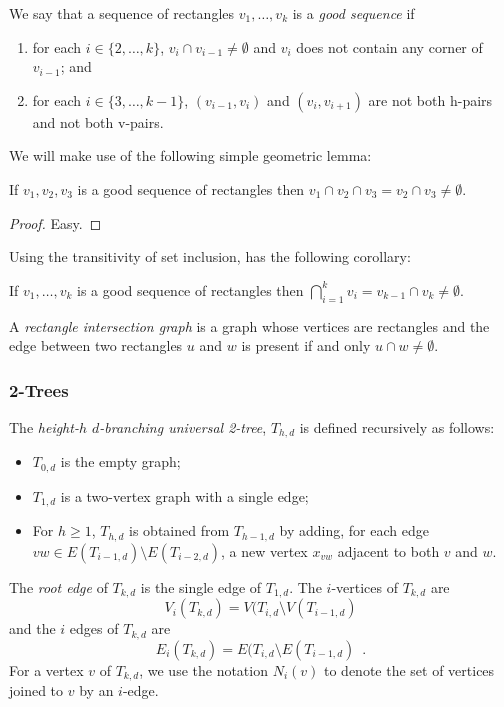 \documentclass[lotsofwhite]{patmorin}
\begin{document}
We say that a sequence of rectangles $v_1,\ldots,v_k$ is a \emph{good
sequence} if
\begin{enumerate}
  \item for each $i\in\{2,\ldots,k\}$, $v_i\cap v_{i-1}\neq \emptyset$
        and $v_i$ does not contain any corner of $v_{i-1}$; and
  \item for each $i\in\{3,\ldots,k-1\}$, $(v_{i-1},v_i)$ and
        $(v_i,v_{i+1})$ are not both h-pairs and not both v-pairs.
\end{enumerate}
We will make use of the following simple geometric lemma:
\begin{lem}
  If $v_1,v_2,v_3$ is a good sequence of rectangles then
  $v_1\cap v_2\cap v_3=v_2\cap v_3 \neq \emptyset$.
\end{lem}

\begin{proof}
  Easy.
\end{proof}

Using the transitivity of set inclusion,  has the
following corollary:

\begin{cor}
  If $v_1,\ldots,v_k$ is a good sequence of rectangles then 
  $\bigcap_{i=1}^{k} v_i = v_{k-1}\cap v_k \neq \emptyset$.
\end{cor}

A \emph{rectangle intersection graph} is a graph whose vertices are
rectangles and the edge between two rectangles $u$ and $w$ is present
if and only $u\cap w\neq \emptyset$.

\subsubsection{2-Trees}


The \emph{height-$h$ $d$-branching universal 2-tree}, $T_{h,d}$ is
defined recursively as follows:
\begin{itemize}
  \item $T_{0,d}$ is the empty graph;
  \item $T_{1,d}$ is a two-vertex graph with a single edge;
  \item For $h\ge 1$, $T_{h,d}$ is obtained from $T_{h-1,d}$ by adding,
     for each edge $vw \in E(T_{i-1,d})\setminus E(T_{i-2,d})$,
     a new vertex $x_{vw}$ adjacent to both $v$ and $w$.
\end{itemize}
The \emph{root edge} of $T_{k,d}$ is the single edge of $T_{1,d}$.
The $i$-vertices of $T_{k,d}$ are \[ V_i(T_{k,d}) = V(T_{i,d}\setminus
V(T_{i-1,d}) \] and the $i$ edges of $T_{k,d}$ are \[ E_i(T_{k,d})
= E(T_{i,d}\setminus E(T_{i-1,d}) \enspace . \] For a vertex $v$ of
$T_{k,d}$, we use the notation $N_i(v)$ to denote the set of vertices
joined to $v$ by an $i$-edge.
\end{document}

